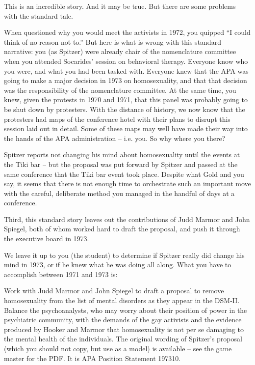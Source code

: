 This is an incredible story. And it may be true. But there are some problems with the standard tale.

When questioned why you would meet the activists in 1972, you quipped ``I could think of no reason not to.'' But here is what is wrong with this standard narrative: you (as Spitzer) were already chair of the nomenclature committee when you attended Socarides' session on behavioral therapy. Everyone know who you were, and what you had been tasked with. Everyone knew that the APA was going to make a major decision in 1973 on homosexuality, and that that decision was the responsibility of the nomenclature committee. At the same time, you knew, given the protests in 1970 and 1971, that this panel was probably going to be shut down by protesters. With the distance of history, we now know that the protesters had maps of the conference hotel with their plans to disrupt this session laid out in detail. Some of these maps may well have made their way into the hands of the APA administration – i.e. you. So why where you there?

Spitzer reports not changing his mind about homosexuality until the events at the Tiki bar – but the proposal was put forward by Spitzer and passed at the same conference that the Tiki bar event took place. Despite what Gold and you say, it seems that there is not enough time to orchestrate such an important move with the careful, deliberate method you managed in the handful of days at a conference.

Third, this standard story leaves out the contributions of Judd Marmor and John Spiegel, both of whom worked hard to draft the proposal, and push it through the executive board in 1973. 

We leave it up to you (the student) to determine if Spitzer really did change his mind in 1973, or if he knew what he was doing all along. What you have to accomplish between 1971 and 1973 is:

Work with Judd Marmor and John Spiegel to draft a proposal to remove homosexuality from the list of mental disorders as they appear in the DSM-II. Balance the psychoanalysts, who may worry about their position of power in the psychiatric community, with the demands of the gay activists and the evidence produced by Hooker and Marmor that homosexuality is not per se damaging to the mental health of the individuals. The original wording of Spitzer's proposal (which you should not copy, but use as a model) is available – see the game master for the PDF. It is APA Position Statement 197310.

